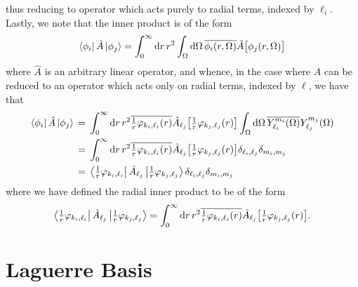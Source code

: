 \documentclass[]{article}
\begin{document}
thus reducing to operator which acts purely to radial terms, indexed by
$\ell_{i}$.
Lastly, we note that the inner product is of the form
\begin{equation*}
  \bra{\phi_{i}}
  \hat{A}
  \ket{\phi_{j}}
  =
  \int_{0}^{\infty}
  \dd{r}
  {
    r^{2}
    \int_{\Omega}
    \dd{\Omega}
    {
      \overline
      {
        \phi_{i}\lr{r, \Omega}
      }
      \hat{A}
      \lrsq[\big]
      {
        \phi_{j}\lr{r, \Omega}
      }
    }
  }
\end{equation*}
where $\hat{A}$ is an arbitrary linear operator, and whence, in the case where
$\hat{A}$ can be reduced to an operator which acts only on radial terms, indexed
by $\ell$, we have that
\begin{alignat*}{2}
  \bra{\phi_{i}}
  \hat{A}
  \ket{\phi_{j}}
  {}={}
  &
  \int_{0}^{\infty}
  \dd{r}
  {
    r^{2}
    \overline
    {
      \tfrac{1}{r}
      \varphi_{k_{i}, \ell_{i}}\lr{r}
    }
    \hat{A}_{\ell_{j}}
    \lrsq[\big]
    {
      \tfrac{1}{r}
      \varphi_{k_{j}, \ell_{j}}\lr{r}
    }
  }
  \int_{\Omega}
  \dd{\Omega}
  {
    \overline
    {
      Y_{\ell_{i}}^{m_{i}}\lr{\Omega}
    }
    Y_{\ell_{j}}^{m_{j}}\lr{\Omega}
  }
  \\
  {}={}
  &
  \int_{0}^{\infty}
  \dd{r}
  {
    r^{2}
    \overline
    {
      \tfrac{1}{r}
      \varphi_{k_{i}, \ell_{i}}\lr{r}
    }
    \hat{A}_{\ell_{j}}
    \lrsq[\big]
    {
      \tfrac{1}{r}
      \varphi_{k_{j}, \ell_{j}}\lr{r}
    }
  }
  \delta_{\ell_{i}, \ell_{j}}
  \delta_{m_{i}, m_{j}}
  \\
  {}={}
  &
  \bra{\tfrac{1}{r}\varphi_{k_{i}, \ell_{i}}}
  \hat{A}_{\ell_{j}}
  \ket{\tfrac{1}{r}\varphi_{k_{j}, \ell_{j}}}
  \delta_{\ell_{i}, \ell_{j}}
  \delta_{m_{i}, m_{j}}
\end{alignat*}
where we have defined the radial inner product to be of the form
\begin{equation*}
  \bra{\tfrac{1}{r}\varphi_{k_{i}, \ell_{i}}}
  \hat{A}_{\ell_{j}}
  \ket{\tfrac{1}{r}\varphi_{k_{j}, \ell_{j}}}
  =
  \int_{0}^{\infty}
  \dd{r}
  {
    r^{2}
    \overline
    {
      \tfrac{1}{r}
      \varphi_{k_{i}, \ell_{i}}\lr{r}
    }
    \hat{A}_{\ell_{j}}
    \lrsq[\big]
    {
      \tfrac{1}{r}
      \varphi_{k_{j}, \ell_{j}}\lr{r}
    }
  }
  .
\end{equation*}

\section{Laguerre Basis}
\label{sec:laguerre-basis}
\end{document}
